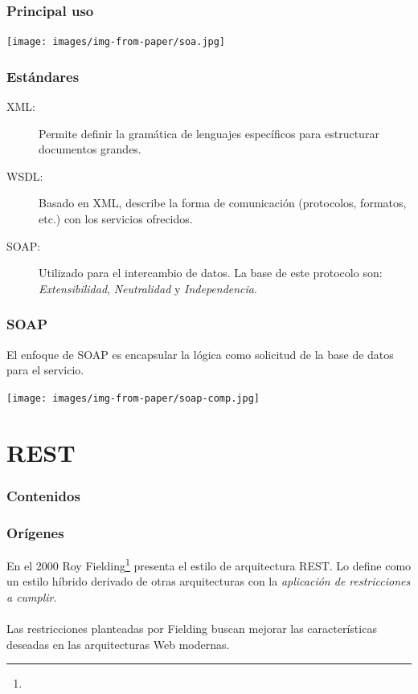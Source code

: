\documentclass{beamer}
\begin{document}
\begin{frame}{\insertsection{}}
  \frametitle{Principal uso}
  \centering
  \texttt{[image: images/img-from-paper/soa.jpg]}
\end{frame}

\begin{frame}{\insertsection{}}
  \frametitle{Estándares}
  \begin{description}
  \item[XML:] Permite definir la gramática de lenguajes
    específicos para estructurar documentos grandes.
  \item[WSDL:] Basado en XML, describe la forma de
    comunicación (protocolos, formatos, etc.) con los servicios
    ofrecidos.
  \item[SOAP:] Utilizado para el intercambio de datos. La base de este
    protocolo son: \emph{Extensibilidad}, \emph{Neutralidad} y
    \emph{Independencia}.
  \end{description}
\end{frame}

\begin{frame}{\insertsection{}}
  \frametitle{SOAP}
  El enfoque de SOAP es encapsular la lógica como solicitud de la base
  de datos para el servicio. 

  \vfill

  \centering
  \texttt{[image: images/img-from-paper/soap-comp.jpg]}
\end{frame}

\section{REST}

\begin{frame}
  \frametitle{Contenidos}
\end{frame}

\begin{frame}{\insertsection{}}
  \frametitle{Orígenes}
  En el 2000 Roy
    Fielding\footnote{}
    presenta el estilo de arquitectura REST. Lo define como un estilo
    híbrido derivado de otras arquitecturas con la \emph{aplicación de
    restricciones a cumplir}.
  \\~\\
  Las restricciones planteadas por Fielding buscan mejorar las
  características deseadas en las arquitecturas Web modernas. 
\end{frame}
\end{document}
